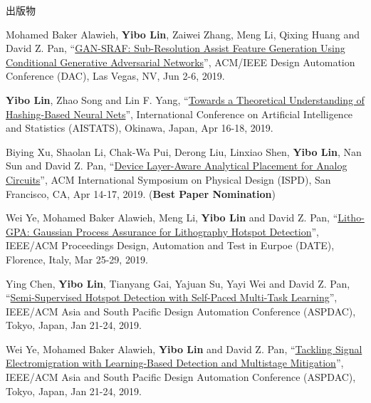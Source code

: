 \begin{rSection}{出版物}
\begin{description}[font=\normalfont]
{}
            

\item[{[C25]}]{
        Mohamed Baker Alawieh, \textbf{Yibo Lin}, Zaiwei Zhang, Meng Li, Qixing Huang and David Z. Pan, 
    ``\href{https://doi.org/10.1145/3316781.3317832}{GAN-SRAF: Sub-Resolution Assist Feature Generation Using Conditional Generative Adversarial Networks}'', 
    ACM/IEEE Design Automation Conference (DAC), Las Vegas, NV, Jun 2-6, 2019.
    
}
            

\item[{[C24]}]{
        \textbf{Yibo Lin}, Zhao Song and Lin F. Yang, 
    ``\href{https://arxiv.org/abs/1812.10244}{Towards a Theoretical Understanding of Hashing-Based Neural Nets}'', 
    International Conference on Artificial Intelligence and Statistics (AISTATS), Okinawa, Japan, Apr 16-18, 2019.
    
}
            

\item[{[C23]}]{
        Biying Xu, Shaolan Li, Chak-Wa Pui, Derong Liu, Linxiao Shen, \textbf{Yibo Lin}, Nan Sun and David Z. Pan, 
    ``\href{https://doi.org/10.1145/3299902.3309751}{Device Layer-Aware Analytical Placement for Analog Circuits}'', 
    ACM International Symposium on Physical Design (ISPD), San Francisco, CA, Apr 14-17, 2019.
    (\textbf{Best Paper Nomination})
}
            

\item[{[C22]}]{
        Wei Ye, Mohamed Baker Alawieh, Meng Li, \textbf{Yibo Lin} and David Z. Pan, 
    ``\href{https://doi.org/10.23919/DATE.2019.8714960}{Litho-GPA: Gaussian Process Assurance for Lithography Hotspot Detection}'', 
    IEEE/ACM Proceedings Design, Automation and Test in Eurpoe (DATE), Florence, Italy, Mar 25-29, 2019.
    
}
            

\item[{[C21]}]{
        Ying Chen, \textbf{Yibo Lin}, Tianyang Gai, Yajuan Su, Yayi Wei and David Z. Pan, 
    ``\href{https://doi.org/10.1145/3287624.3287685}{Semi-Supervised Hotspot Detection with Self-Paced Multi-Task Learning}'', 
    IEEE/ACM Asia and South Pacific Design Automation Conference (ASPDAC), Tokyo, Japan, Jan 21-24, 2019.
    
}
            

\item[{[C20]}]{
        Wei Ye, Mohamed Baker Alawieh, \textbf{Yibo Lin} and David Z. Pan, 
    ``\href{https://doi.org/10.1145/3287624.3287688}{Tackling Signal Electromigration with Learning-Based Detection and Multistage Mitigation}'', 
    IEEE/ACM Asia and South Pacific Design Automation Conference (ASPDAC), Tokyo, Japan, Jan 21-24, 2019.
    
}
\end{description}
\end{rSection}
